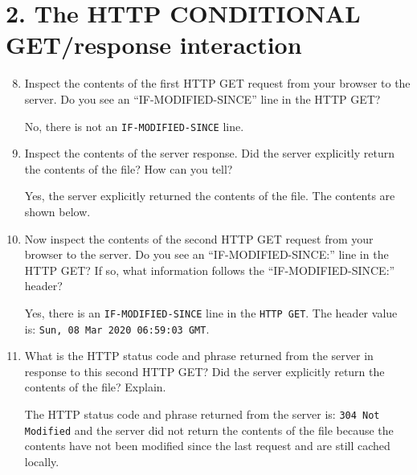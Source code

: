 \documentclass{article}
\begin{document}
\section*{2. The HTTP CONDITIONAL GET/response interaction}
\begin{enumerate}
\setcounter{enumi}{7}
\item Inspect the contents of the first HTTP GET request from your browser to the server. Do you see an “IF-MODIFIED-SINCE” line in the HTTP GET?

\textsf{No, there is not an \texttt{IF-MODIFIED-SINCE} line.}

\item Inspect the contents of the server response. Did the server explicitly return the contents of the file? How can you tell?

\textsf{Yes, the server explicitly returned the contents of the file. The contents are shown below.}

\item Now inspect the contents of the second HTTP GET request from your browser to the server. Do you see an “IF-MODIFIED-SINCE:” line in the HTTP GET? If so, what information follows the “IF-MODIFIED-SINCE:” header?

\textsf{Yes, there is an \texttt{IF-MODIFIED-SINCE} line in the \texttt{HTTP GET}. The header value is: \texttt{Sun, 08 Mar 2020 06:59:03 GMT}.}

\item What is the HTTP status code and phrase returned from the server in response to this second HTTP GET? Did the server explicitly return the contents of the file? Explain.

\textsf{The HTTP status code and phrase returned from the server is: \texttt{304 Not Modified} and the server did not return the contents of the file because the contents have not been modified since the last request and are still cached locally.}


\end{enumerate}
\end{document}
